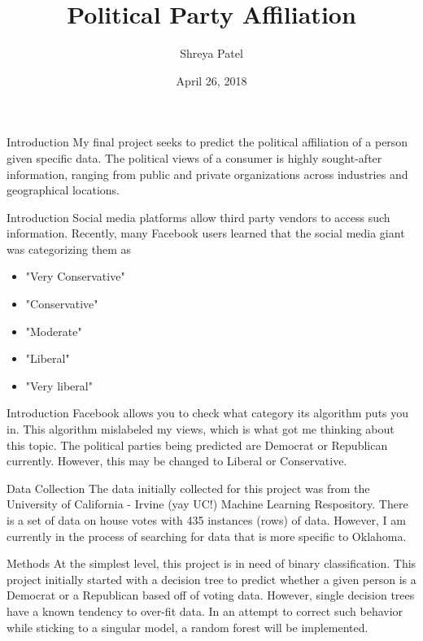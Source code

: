 \documentclass[10pt]{beamer}
\title{Political Party Affiliation}
\subtitle{ }
\date{April 26, 2018}
\author{Shreya Patel}
\institute{Data Science for Economists}
\begin{document}
\maketitle


\begin{frame}[fragile]{Introduction}
  My final project seeks to predict the political affiliation of a person given specific data. The political views of a consumer is highly sought-after information, ranging from public and private organizations across industries and geographical locations. 
\end{frame}

\begin{frame}[fragile]{Introduction}
  Social media platforms allow third party vendors to access such information. Recently, many Facebook users learned that the social media giant was categorizing them as
  \begin{itemize}
      \item "Very Conservative"
      \item "Conservative"
      \item "Moderate"
      \item "Liberal"
      \item "Very liberal"
  \end{itemize}
\end{frame}

\begin{frame}[fragile]{Introduction}
    Facebook allows you to check what category its algorithm puts you in. This algorithm mislabeled my views, which is what got me thinking about this topic. The political parties being predicted are Democrat or Republican currently. However, this may be changed to Liberal or Conservative.
\end{frame}

\begin{frame}{Data Collection}
	The data initially collected for this project was from the University of California - Irvine (yay UC!) Machine Learning Respository. There is a set of data on house votes with 435 instances (rows) of data. However, I am currently in the process of searching for data that is more specific to Oklahoma.
\end{frame}


\begin{frame}[fragile]{Methods}
      At the simplest level, this project is in need of binary classification. This project initially started with a decision tree to predict whether a given person is a Democrat or a Republican based off of voting data. However, single decision trees have a known tendency to over-fit data. In an attempt to correct such behavior while sticking to a singular model, a random forest will be implemented.
\end{frame}
\end{document}
